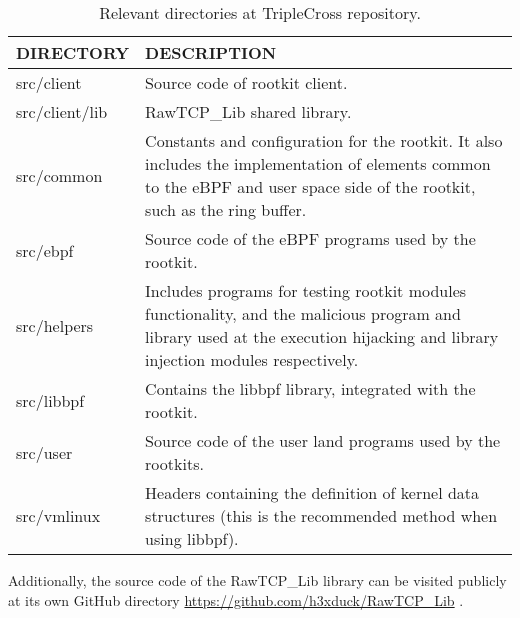 \begin{table}[htbp]
\begin{tabular}{|>{\centering\arraybackslash}p{4cm}|>{\centering\arraybackslash}p{10cm}|}
\hline
\textbf{DIRECTORY} & \textbf{DESCRIPTION}\\
\hline
\hline
src/client & Source code of rootkit client.\\
\hline
src/client/lib & RawTCP\_Lib shared library.\\
\hline
src/common & Constants and configuration for the rootkit. It also includes the implementation of elements common to the eBPF and user space side of the rootkit, such as the ring buffer.\\
\hline
src/ebpf & Source code of the eBPF programs used by the rootkit.\\
\hline
src/helpers & Includes programs for testing rootkit modules functionality, and the malicious program and library used at the execution hijacking and library injection modules respectively.\\
\hline
src/libbpf & Contains the libbpf library, integrated with the rootkit.\\
\hline
src/user & Source code of the user land programs used by the rootkits.\\
\hline
src/vmlinux & Headers containing the definition of kernel data structures (this is the recommended method when using libbpf).\\
\hline
\end{tabular}
\caption{Relevant directories at TripleCross repository.}
\label{table:triplecross_dirs}
\end{table}

Additionally, the source code of the RawTCP\_Lib library can be visited publicly at its own GitHub directory \url{https://github.com/h3xduck/RawTCP_Lib} \cite{rawtcp_lib}.

